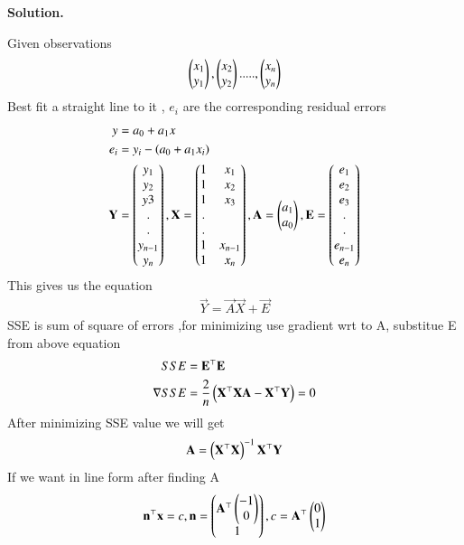 \documentclass[journal,12pt,twocolumn]{IEEEtran}
\begin{document}
	\textbf{Solution.}
	
	
	Given observations
	\begin{align}
		 \begin{pmatrix}x_1\\y_1\end{pmatrix},\begin{pmatrix}x_2\\y_2\end{pmatrix}.....,\begin{pmatrix}x_n\\y_n\end{pmatrix}
	\end{align}
	Best fit a straight line to it , $e_i$ are the corresponding residual errors
	      \begin{align}
	      	y&=a_0+a_1x\\
	      	e_i&=y_i-\left(a_0+a_1x_i\right)\\
	      	\mathbf{Y}&=\begin{pmatrix}y_1\\y_2\\y3\\.\\.\\y_{n-1}\\y_n\end{pmatrix},
	      	\mathbf{X}=\begin{pmatrix}1&x_1\\1&x_2\\1& x_3\\.&\\.&\\1&x_{n-1}\\1&x_n\end{pmatrix},
	      	\mathbf{A}=\begin{pmatrix}a_1\\a_0\end{pmatrix},
	      	\mathbf{E}=\begin{pmatrix}e_1\\e_2\\e_3\\.\\.\\e_{n-1}\\e_n\end{pmatrix}
	      	\end{align}
      	This gives us the equation
      	\begin{align}
      		\vec{Y}=\vec{A}\vec{X}+\vec{E}
      	\end{align}
SSE is sum of square of errors ,for minimizing use gradient wrt to A, substitue E from above equation
      \begin{align}
      	SSE&=\mathbf{E}^{\top}\mathbf{E}\\        
        \nabla SSE&=\frac{2}{n}\left(\mathbf{X}^{\top}\mathbf{X}\mathbf{A}-\mathbf{X}^{\top}\mathbf{Y}\right)=0        
  \end{align}
  After minimizing SSE value we will get
      \begin{align}
        \mathbf{A}=\left(\mathbf{X}^{\top}\mathbf{X}\right)^{-1}\mathbf{X}^{\top}\mathbf{Y}
      \end{align}
  If we want in line form after finding A
  \begin{align}
  	\mathbf{n}^{\top}\mathbf{x}=c, \mathbf{n}=\begin{pmatrix}\mathbf{A}^{\top}\begin{pmatrix}-1\\0\end{pmatrix}\\1\end{pmatrix},c=\mathbf{A}^{\top}\begin{pmatrix}0\\1\end{pmatrix}
  \end{align}
\end{document}

